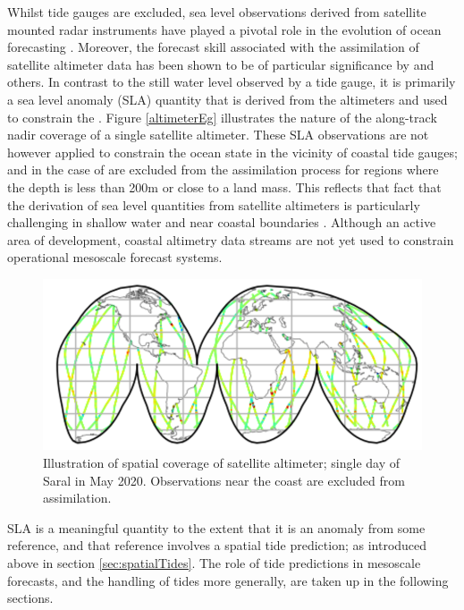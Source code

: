 Whilst tide gauges are excluded, sea level observations derived from satellite mounted radar instruments have played a pivotal role in the evolution of ocean forecasting \citep{Fu:2001ub}.  Moreover, the forecast skill associated with the assimilation of satellite altimeter data has been shown to be of particular significance by  \cite{10.5194/os-13-1077-2017} and others.
In contrast to the still water level observed by a tide gauge, it is primarily a sea level anomaly (SLA) quantity that is derived from the altimeters and used to constrain the \OGCM{}. Figure \ref{altimeterEg} illustrates the nature of the along-track nadir coverage of a single satellite altimeter.
These SLA observations are not however applied to constrain the ocean state in the vicinity of coastal tide gauges; and in the case of \BL{} are excluded from the assimilation process for regions where the depth is less than 200m or close to a land mass.   This reflects that fact that the derivation of sea level quantities from satellite altimeters is particularly challenging in shallow water and near coastal boundaries \citep{Woodworth:2011bf}.    Although an active area of development, coastal altimetry data streams are not yet used to constrain operational mesoscale forecast  systems.
\begin{figure}[h]\centering
  \includegraphics[width=\figwidthHalf]{figures/maps/altimeterCoverageEg.png}
  \caption{Illustration of spatial coverage of satellite altimeter; single day of Saral in May 2020. Observations near the coast are excluded from assimilation.}
  \label{fig:altimeterEg}
\end{figure}
SLA is a meaningful quantity to the extent that it is an anomaly from some reference, and that reference involves a spatial tide prediction; as introduced above in section \ref{sec:spatialTides}.
The role of tide predictions in mesoscale forecasts, and the handling of tides more generally, are taken up in the following sections.
